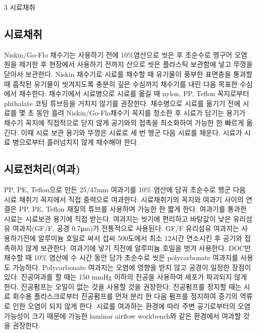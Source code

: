 \documentclass[
]{book}
\begin{document}
3 시료채취

\hypertarget{uxc2dcuxb8ccuxcc44uxcde8-2}{%
\subsection{시료채취}\label{uxc2dcuxb8ccuxcc44uxcde8-2}}

Niskin/Go-Flo 채수기는 사용하기 전에 10\%염산으로 씻은 후 초순수로 헹구어 오염원을 제거한 후 현장에서 사용하기 전까지 산으로 씻은 플라스틱 보관함에 넣고 뚜껑을 닫아서 보관한다. Niskin 채수기로 시료를 채수할 때 유기물이 풍부한 표면층을 통과할 때 흡착된 유기물이 씻겨지도록 충분히 깊은 수심까지 채수기를 내린 다음 목표한 수심에서 채수한다. 채수기에서 시료병으로 시료를 옮길 때 nylon, PP, Teflon 꼭지로부터 phthalate 코팅 튜브등을 거치지 않기를 권장한다. 채수병으로 시료를 옮기기 전에 시료를 몇 초 동안 흘려 Niskin/Go-Flo채수기 꼭지를 청소한 후 시료가 담기는 용기가 채수기 꼭지에 직접적으로 닫지 않게 공기와의 접촉을 최소화하여 가능한 한 빠르게 옮긴다. 이때 시료 보관 용기와 뚜껑은 시료로 세 번 헹군 다음 시료를 채운다. 시료가 시료 병으로부터 흘러넘치지 않게 채수해야 한다.

\hypertarget{uxc2dcuxb8ccuxc804uxcc98uxb9acuxc5ecuxacfc}{%
\subsection{시료전처리(여과)}\label{uxc2dcuxb8ccuxc804uxcc98uxb9acuxc5ecuxacfc}}

PP, PE, Teflon으로 만든 25/47mm 여과기를 10\% 염산에 담궈 초순수로 헹군 다음 시료 채취기 꼭지에서 직접 중력으로 여과한다. 시료채취기의 꼭지와 여과기 사이의 연결은 PP, PE, Teflon 재질의 튜브를 사용하며 가능한 한 짧게 한다. 여과기를 통과한 시료는 시료보관 용기에 직접 받는다.
여과지는 씻기에 편리하고 바탕값이 낮은 유리섬유 여과지(GF/F, 공경 0.7μm)가 전통적으로 사용된다. GF/F 유리섬유 여과지는 사용하기전에 알루미늄 호일로 싸서 섭씨 500도에서 최소 12시간 연소시킨 후 공기와 접촉하지 않게 보관한다. 여과기에 넣기 직전에 알루미늄 호일을 벗겨 사용한다. DOC만 채수할 때 10\% 염산에 수 시간 동안 담가 초순수로 씻은 polycarbonate 여과지를 사용도 가능하다. Polycarbonate 여과지는 오염에 영향을 받지 않고 공경이 일정한 장점이 있다.
진공여과를 할 때는 150 mmHg 이하의 진공을 사용하여 세포가 파괴되지 않게 한다. 진공펌프는 오일이 없는 것을 사용할 것을 권장한다. 진공펌프를 정지할 때는 시료 회수용 플라스크로부터 진공펌프를 먼저 분리 한 다음 펌프를 정지하여 증기의 역류로 인한 오염이 되지 않게 한다. 시료를 여과하는 환경에 따라 주변 공기로부터의 오염 가능성이 크기 때문에 가능한 laminar airflow workbench와 같은 환경에서 여과할 것을 권장한다.
\end{document}
